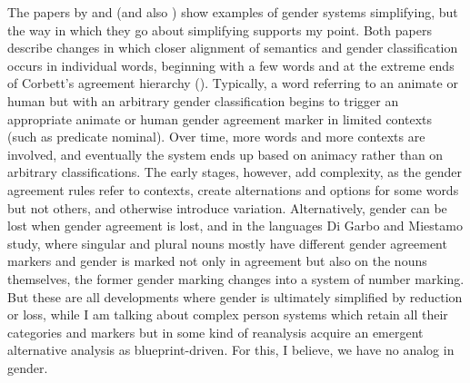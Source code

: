 \documentclass[output=collectionpaper]{langsci/langscibook}
\begin{document}
The papers by  and  (and also \citealt{Maho1999}) show examples of gender systems simplifying, but the way in which they go about simplifying supports my point. Both papers describe changes in which closer alignment of semantics and gender classification occurs in individual words, beginning with a few words and at the extreme ends of Corbett's agreement hierarchy (\citeyear[248--259]{Corbett1991}). Typically, a word referring to an animate or human but with an arbitrary gender classification begins to trigger an appropriate animate or human gender agreement marker in limited contexts (such as predicate nominal). Over time, more words and more contexts are involved, and eventually the system ends up based on animacy rather than on arbitrary classifications. The early stages, however, add complexity, as the gender agreement rules refer to contexts, create alternations and options for some words but not others, and otherwise introduce variation. Alternatively, gender can be lost when gender agreement is lost, and in the languages Di Garbo and Miestamo study, where singular and plural nouns mostly have different gender agreement markers and gender is marked not only in agreement but also on the nouns themselves, the former gender marking changes into a system of number marking. But these are all developments where gender is ultimately simplified by reduction or loss, while I am talking about complex person systems which retain all their categories and markers but in some kind of reanalysis acquire an emergent alternative analysis as blueprint-driven. For this, I believe, we have no analog in gender.
\end{document}
